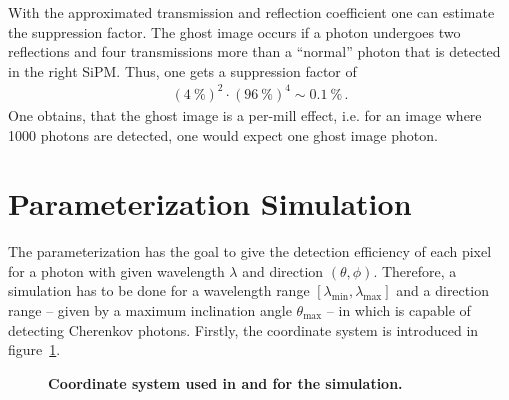 With the approximated transmission and reflection coefficient one can estimate the suppression factor. The ghost image occurs if a photon undergoes two reflections and four transmissions more than a \enquote{normal} photon that is detected in the right SiPM. Thus, one gets a suppression factor of
\begin{align}
	(\SI{4}{\percent})^2 \cdot (\SI{96}{\percent})^4 \sim \SI{0.1}{\percent}\,.
\end{align}
One obtains, that the ghost image is a per-mill effect, i.e. for an image where \num{1000} photons are detected, one would expect one ghost image photon.

\section{Parameterization Simulation}

The parameterization has the goal to give the detection efficiency of each pixel for a photon with given wavelength $\lambda$ and direction $(\theta,\phi)$. Therefore, a simulation has to be done for a wavelength range $[\lambda_\text{min}, \lambda_\text{max}]$ and a direction range -- given by a maximum inclination angle $\theta_\text{max}$ -- in which \iceact is capable of detecting Cherenkov photons. Firstly, the \geant coordinate system is introduced in figure~\ref{geant_coords}.\\

\begin{figure}[H]
	\centering
	\begin{subfigure}[t]{0.49\textwidth}
	\end{subfigure}
	\hfill
	\begin{subfigure}[t]{0.49\textwidth}
		\usebox{\savedimage}
	\end{subfigure}
	\caption[Coordinate system used in \geant and for the simulation]{\textbf{Coordinate system used in \geant and for the simulation.} }
	\label{geant_coords}
\end{figure}

